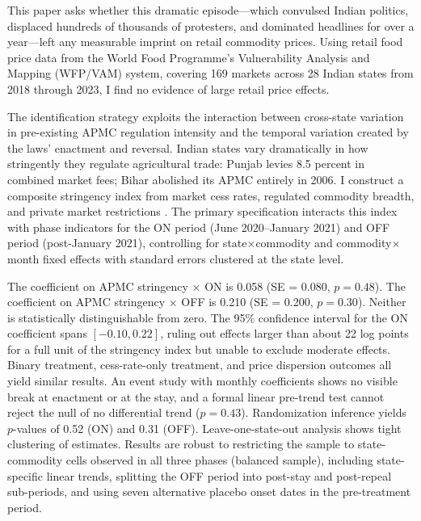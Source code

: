 \documentclass[12pt]{article}
\begin{document}
This paper asks whether this dramatic episode---which convulsed Indian politics, displaced hundreds of thousands of protesters, and dominated headlines for over a year---left any measurable imprint on retail commodity prices. Using retail food price data from the World Food Programme's Vulnerability Analysis and Mapping (WFP/VAM) system, covering 169 markets across 28 Indian states from 2018 through 2023, I find no evidence of large retail price effects.

The identification strategy exploits the interaction between cross-state variation in pre-existing APMC regulation intensity and the temporal variation created by the laws' enactment and reversal. Indian states vary dramatically in how stringently they regulate agricultural trade: Punjab levies 8.5 percent in combined market fees; Bihar abolished its APMC entirely in 2006. I construct a composite stringency index from market cess rates, regulated commodity breadth, and private market restrictions \citep{chand2015agricultural, chatterjee2020apmc, acharya2006marketing}. The primary specification interacts this index with phase indicators for the ON period (June 2020--January 2021) and OFF period (post-January 2021), controlling for state$\times$commodity and commodity$\times$month fixed effects with standard errors clustered at the state level.

The coefficient on APMC stringency $\times$ ON is 0.058 (SE = 0.080, $p = 0.48$). The coefficient on APMC stringency $\times$ OFF is 0.210 (SE = 0.200, $p = 0.30$). Neither is statistically distinguishable from zero. The 95\% confidence interval for the ON coefficient spans $[-0.10, 0.22]$, ruling out effects larger than about 22 log points for a full unit of the stringency index but unable to exclude moderate effects. Binary treatment, cess-rate-only treatment, and price dispersion outcomes all yield similar results. An event study with monthly coefficients shows no visible break at enactment or at the stay, and a formal linear pre-trend test cannot reject the null of no differential trend ($p = 0.43$). Randomization inference yields $p$-values of 0.52 (ON) and 0.31 (OFF). Leave-one-state-out analysis shows tight clustering of estimates. Results are robust to restricting the sample to state-commodity cells observed in all three phases (balanced sample), including state-specific linear trends, splitting the OFF period into post-stay and post-repeal sub-periods, and using seven alternative placebo onset dates in the pre-treatment period.
\end{document}
